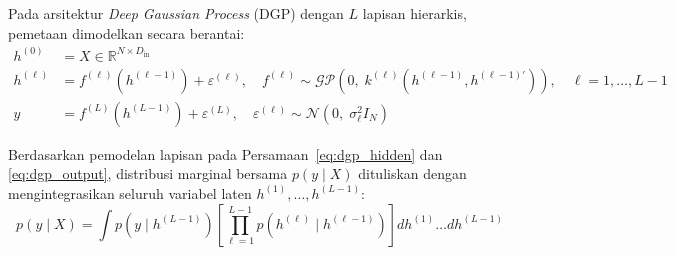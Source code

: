 \documentclass[11pt,a4paper]{article}
\def\boldsymbol#1{#1}%
\def\mathbf#1{#1}%
\theoremstyle{plain}
\theoremstyle{definition}
\theoremstyle{remark}
\begin{document}
\noindent Pada arsitektur \textit{Deep Gaussian Process} (DGP) dengan $L$ lapisan hierarkis, pemetaan dimodelkan secara berantai:
\begin{align}
    \mathbf{h}^{(0)} &= X \in \mathbb{R}^{N \times D_{\text{in}}} \label{eq:dgp_input} \\
    \mathbf{h}^{(\ell)} &= \mathbf{f}^{(\ell)}\left(\mathbf{h}^{(\ell-1)}\right) + \boldsymbol{\varepsilon}^{(\ell)}, \quad \mathbf{f}^{(\ell)} \sim \mathcal{GP}\left(\mathbf{0}, \; k^{(\ell)}\left(\mathbf{h}^{(\ell-1)}, \mathbf{h}^{(\ell-1)'}\right)\right), \quad \ell = 1, \dots, L-1 \label{eq:dgp_hidden} \\
    \mathbf{y} &= \mathbf{f}^{(L)}\left(\mathbf{h}^{(L-1)}\right) + \boldsymbol{\varepsilon}^{(L)}, \quad \boldsymbol{\varepsilon}^{(\ell)} \sim \mathcal{N}\left(\mathbf{0}, \; \sigma_\ell^2 I_N\right) \label{eq:dgp_output}
\end{align}

\noindent Berdasarkan pemodelan lapisan pada Persamaan~\eqref{eq:dgp_hidden} dan \eqref{eq:dgp_output}, distribusi marginal bersama $p(\mathbf{y} \mid X)$ dituliskan dengan mengintegrasikan seluruh variabel laten $\mathbf{h}^{(1)}, \dots, \mathbf{h}^{(L-1)}$:
\begin{equation}
    p(\mathbf{y} \mid X) = \int p\left(\mathbf{y} \mid \mathbf{h}^{(L-1)}\right) \left[ \prod_{\ell=1}^{L-1} p\left(\mathbf{h}^{(\ell)} \mid \mathbf{h}^{(\ell-1)}\right) \right] d\mathbf{h}^{(1)} \dots d\mathbf{h}^{(L-1)}
    \label{eq:integral_dgp_marginal}
\end{equation}
\end{document}
